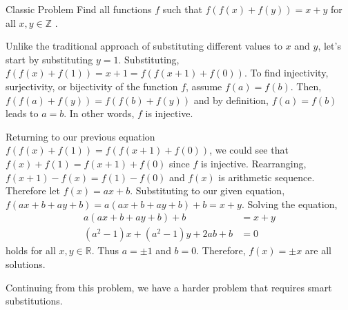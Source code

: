 \documentclass[../../main.tex]{subfiles}
\begin{document}
\begin{problem}{Classic Problem \easy}{}
Find all functions $f$ such that $f(f(x) + f(y)) = x + y$ for all
$x, y \in \mathbb{Z}$ \cite{MATH01-5}.
\end{problem}
\begin{solution}
Unlike the traditional approach of substituting different values
to $x$ and $y$, let's start by substituting $y = 1$. Substituting,
$f(f(x) + f(1)) = x + 1 = f(f(x + 1) + f(0))$. To find injectivity,
surjectivity, or bijectivity of the function $f$, assume
$f(a) = f(b)$. Then, $f(f(a) + f(y)) = f(f(b) + f(y))$ and by
definition, $f(a) = f(b)$ leads to $a = b$. In other words,
$f$ is injective.

Returning to our previous equation $f(f(x) + f(1)) =
f(f(x + 1) + f(0))$, we could see that $f(x) + f(1) = f(x + 1) + f(0)$
since $f$ is injective. Rearranging, $f(x + 1) - f(x) = f(1) - f(0)$
and $f(x)$ is arithmetic sequence. Therefore let $f(x) = ax + b$.
Substituting to our given equation, $f(ax + b + ay + b) =
a (ax + b + ay + b) + b = x + y$. Solving the equation,
\begin{align*}
    a (ax + b + ay + b) + b &= x + y \\
    \left( a^2 - 1 \right) x + \left( a^2 - 1 \right) y
        + 2ab + b &= 0
\end{align*}
holds for all $x, y \in \mathbb{R}$. Thus $a = \pm 1$ and $b = 0$.
Therefore, $f(x) = \pm x$ are all solutions.
\end{solution}

Continuing from this problem, we have a harder problem that requires
smart substitutions.
\end{document}
